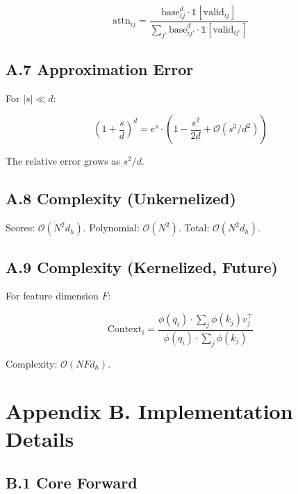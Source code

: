 \[
\text{attn}_{ij} = \frac{\text{base}_{ij}^d \cdot \mathbb{1}[\text{valid}_{ij}]}{\sum_{j'} \text{base}_{ij'}^d \cdot \mathbb{1}[\text{valid}_{ij'}]}
\tag{A.7}
\]

\subsection{A.7 Approximation Error}

For $|s| \ll d$:

\[
\left(1 + \frac{s}{d}\right)^d = e^s \cdot \left(1 - \frac{s^2}{2d} + \mathcal{O}(s^3/d^2)\right)
\tag{A.8}
\]

The relative error grows as $s^2/d$.

\subsection{A.8 Complexity (Unkernelized)}

Scores: $\mathcal{O}(N^2 d_h)$.
Polynomial: $\mathcal{O}(N^2)$.
Total: $\mathcal{O}(N^2 d_h)$.

\subsection{A.9 Complexity (Kernelized, Future)}

For feature dimension $F$:

\[
\text{Context}_i = \frac{\phi(q_i) \cdot \sum_j \phi(k_j) v_j^\top}{\phi(q_i) \cdot \sum_j \phi(k_j)}
\tag{A.9}
\]

Complexity: $\mathcal{O}(N F d_h)$.



\section{Appendix B. Implementation Details}

\subsection{B.1 Core Forward}

